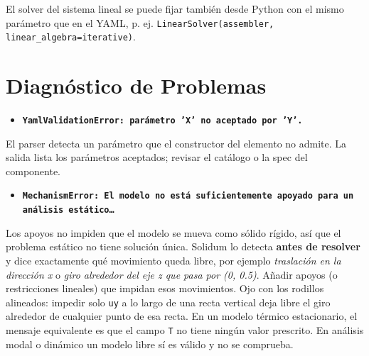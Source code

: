 \documentclass[11pt,oneside]{report}
\begin{document}
El solver del sistema lineal se puede fijar también desde Python con el mismo parámetro que en el YAML, p. ej. \texttt{LinearSolver(assembler, linear\_\allowbreak{}algebra=\textquotedbl{}iterative\textquotedbl{})}.


\newpage

\chapter{Diagnóstico de Problemas}
\label{cap:12}



\begin{itemize}
  \item \textbf{\texttt{YamlValidationError: parámetro 'X' no aceptado por 'Y'.\allowbreak{}}}
\end{itemize}
  El parser detecta un parámetro que el constructor del elemento no admite. La salida lista los parámetros aceptados; revisar el catálogo o la spec del componente.

\begin{itemize}
  \item \textbf{\texttt{MechanismError: El modelo no está suficientemente apoyado para un análisis estático\ldots{}}}
\end{itemize}
  Los apoyos no impiden que el modelo se mueva como sólido rígido, así que el problema estático no tiene solución única. Solidum lo detecta \textbf{antes de resolver} y dice exactamente qué movimiento queda libre, por ejemplo \textit{\textquotedbl{}traslación en la dirección x\textquotedbl{}} o \textit{\textquotedbl{}giro alrededor del eje z que pasa por (0, 0.5)\textquotedbl{}}. Añadir apoyos (o restricciones lineales) que impidan esos movimientos. Ojo con los rodillos alineados: impedir solo \texttt{uy} a lo largo de una recta vertical deja libre el giro alrededor de cualquier punto de esa recta. En un modelo térmico estacionario, el mensaje equivalente es que el campo \texttt{T} no tiene ningún valor prescrito. En análisis modal o dinámico un modelo libre sí es válido y no se comprueba.
\end{document}
